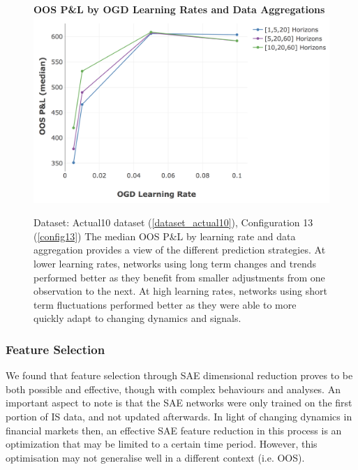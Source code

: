 \documentclass[a4paper,11pt,oneside]{article}
\theoremstyle{plain}
\theoremstyle{definition}
\begin{document}
	\begin{figure}[H]
		\textbf{OOS P\&L by OGD Learning Rates and Data Aggregations}
		\centering
		\includegraphics[scale=0.4]{images/results/8_2_determinants/OOS_OGDLR_Delta_PL_median.png}
		\caption[OOS P\&L by OGD Learning Rates and Data Aggregations]
		{Dataset: Actual10 dataset (\ref{dataset_actual10}), Configuration 13 (\ref{config13})
			\newline The median OOS P\&L by learning rate and data aggregation provides a view of the different prediction strategies. At lower learning rates, networks using long term changes and trends performed better as they benefit from smaller adjustments from one observation to the next. At high learning rates, networks using short term fluctuations performed better as they were able to more quickly adapt to changing dynamics and signals.}
		\label{figure-actual_ogd_lr_data}
	\end{figure}
	
	\subsubsection{Feature Selection}
	
	We found that feature selection through SAE dimensional reduction proves to be both possible and effective, though with complex behaviours and analyses. An important aspect to note is that the SAE networks were only trained on the first portion of IS data, and not updated afterwards. In light of changing dynamics in financial markets then, an effective SAE feature reduction in this process is an optimization that may be limited to a certain time period. However, this optimisation may not generalise well in a different context (i.e. OOS). \newline
	
\end{document}
